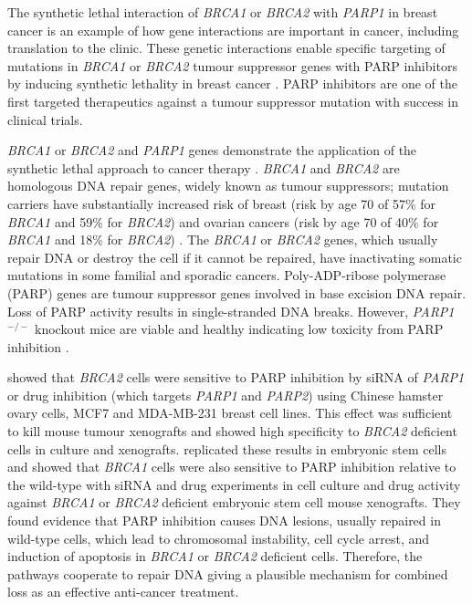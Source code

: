The synthetic lethal interaction of \textit{BRCA1} or \textit{BRCA2} with \textit{PARP1} in breast cancer is an example of how gene interactions are important in cancer, including translation to the clinic. These genetic interactions enable specific targeting of mutations in \textit{BRCA1} or \textit{BRCA2} tumour suppressor genes with PARP inhibitors by inducing synthetic lethality in breast cancer \citep{Farmer2005}. PARP inhibitors are one of the first targeted therapeutics against a tumour suppressor mutation with success in clinical trials. 

\textit{BRCA1} or \textit{BRCA2} and \textit{PARP1} genes demonstrate the application of the synthetic lethal approach to cancer therapy \citet{Ashworth2008, Kaelin2005}. \textit{BRCA1} and \textit{BRCA2} are homologous DNA repair genes, widely known as tumour suppressors; mutation carriers have substantially increased risk of breast (risk by age 70 of 57\% for \textit{BRCA1} and 59\% for \textit{BRCA2}) and ovarian cancers (risk by age 70 of 40\% for \textit{BRCA1} and 18\% for \textit{BRCA2}) \citep{Chen2007}. The \textit{BRCA1} or \textit{BRCA2} genes, which usually repair DNA or destroy the cell if it cannot be repaired, have inactivating somatic mutations in some familial and sporadic cancers. Poly-ADP-ribose polymerase (PARP) genes are tumour suppressor genes involved in base excision DNA repair. Loss of PARP activity results in single-stranded DNA breaks. However, \textit{PARP1}$^{-/-}$ knockout mice are viable and healthy indicating low toxicity from PARP inhibition \citep{Bryant2005}.  

\citet{Bryant2005} showed that \textit{BRCA2} cells were sensitive to PARP inhibition by siRNA of \textit{PARP1} or drug inhibition (which targets \textit{PARP1} and \textit{PARP2}) using Chinese hamster ovary cells, MCF7 and MDA-MB-231 breast cell lines. This effect was sufficient to kill mouse tumour xenografts and showed high specificity to \textit{BRCA2} deficient cells in culture and xenografts. \citet{Farmer2005} replicated these results in embryonic stem cells and showed that \textit{BRCA1} cells were also sensitive to PARP inhibition relative to the wild-type with siRNA and drug experiments in cell culture and drug activity against \textit{BRCA1} or \textit{BRCA2} deficient embryonic stem cell mouse xenografts. They found evidence that PARP inhibition causes DNA lesions, usually repaired in wild-type cells, which lead to chromosomal instability, cell cycle arrest, and induction of apoptosis in \textit{BRCA1} or \textit{BRCA2} deficient cells. Therefore, the pathways cooperate to repair DNA giving a plausible mechanism for combined loss as an effective anti-cancer treatment.  

